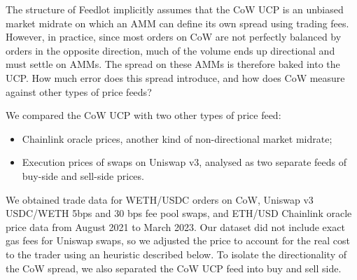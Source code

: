 \documentclass[a4paper,10pt]{article}
\theoremstyle{remark}
\begin{document}
The structure of Feedlot implicitly assumes that the CoW UCP is an unbiased market midrate on which an AMM can define its own spread using trading fees.
%
However, in practice, since most orders on CoW are not perfectly balanced by orders in the opposite direction, much of the volume ends up directional and must settle on AMMs.
%
The spread on these AMMs is therefore baked into the UCP.
%
How much error does this spread introduce, and how does CoW measure against other types of price feeds?

We compared the CoW UCP with two other types of price feed:
\begin{itemize}
  \item Chainlink oracle prices, another kind of non-directional market midrate;
  \item Execution prices of swaps on Uniswap v3, analysed as two separate feeds of buy-side and sell-side prices.
\end{itemize}
We obtained trade data for WETH/USDC orders on CoW, Uniswap v3 USDC/WETH 5bps and 30 bps fee pool swaps, and ETH/USD Chainlink oracle price data from August 2021 to March 2023. 
%
Our dataset did not include exact gas fees for Uniswap swaps, so we adjusted the price to account for the real cost to the trader using an heuristic described below.
%
To isolate the directionality of the CoW spread, we also separated the CoW UCP feed into buy and sell side.
\end{document}
